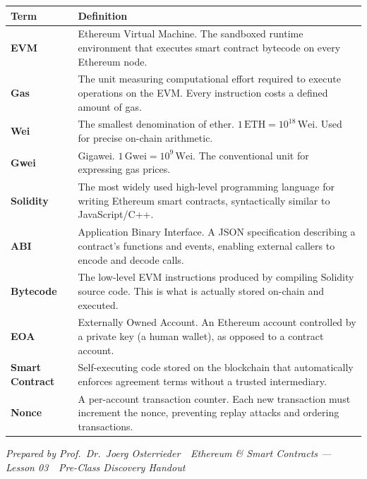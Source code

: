\documentclass[11pt,a4paper]{article}
\begin{document}
\renewcommand{\arraystretch}{1.25}
\noindent\begin{tabular}{@{}p{2.8cm}p{11.8cm}@{}}
\toprule
\textbf{Term} & \textbf{Definition} \\
\midrule
\textbf{EVM}           & Ethereum Virtual Machine. The sandboxed runtime environment that executes smart contract bytecode on every Ethereum node. \\
\textbf{Gas}           & The unit measuring computational effort required to execute operations on the EVM. Every instruction costs a defined amount of gas. \\
\textbf{Wei}           & The smallest denomination of ether. $1\,\text{ETH} = 10^{18}\,\text{Wei}$. Used for precise on-chain arithmetic. \\
\textbf{Gwei}          & Gigawei. $1\,\text{Gwei} = 10^{9}\,\text{Wei}$. The conventional unit for expressing gas prices. \\
\textbf{Solidity}      & The most widely used high-level programming language for writing Ethereum smart contracts, syntactically similar to JavaScript/C++. \\
\textbf{ABI}           & Application Binary Interface. A JSON specification describing a contract's functions and events, enabling external callers to encode and decode calls. \\
\textbf{Bytecode}      & The low-level EVM instructions produced by compiling Solidity source code. This is what is actually stored on-chain and executed. \\
\textbf{EOA}           & Externally Owned Account. An Ethereum account controlled by a private key (a human wallet), as opposed to a contract account. \\
\textbf{Smart Contract} & Self-executing code stored on the blockchain that automatically enforces agreement terms without a trusted intermediary. \\
\textbf{Nonce}         & A per-account transaction counter. Each new transaction must increment the nonce, preventing replay attacks and ordering transactions. \\
\bottomrule
\end{tabular}

\vspace{6pt}
\noindent\textcolor{mlgray}{\small\textit{Prepared by Prof.\ Dr.\ Joerg Osterrieder \,\textbullet\, Ethereum \& Smart Contracts --- Lesson 03 \,\textbullet\, Pre-Class Discovery Handout}}
\end{document}
